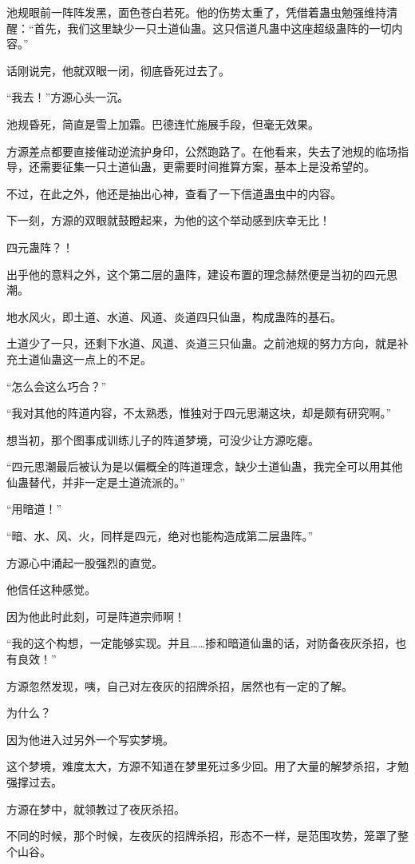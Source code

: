 \begin{this_body}
池规眼前一阵阵发黑，面色苍白若死。他的伤势太重了，凭借着蛊虫勉强维持清醒：“首先，我们这里缺少一只土道仙蛊。这只信道凡蛊中这座超级蛊阵的一切内容。”

话刚说完，他就双眼一闭，彻底昏死过去了。

“我去！”方源心头一沉。

池规昏死，简直是雪上加霜。巴德连忙施展手段，但毫无效果。

方源差点都要直接催动逆流护身印，公然跑路了。在他看来，失去了池规的临场指导，还需要征集一只土道仙蛊，更需要时间推算方案，基本上是没希望的。

不过，在此之外，他还是抽出心神，查看了一下信道蛊虫中的内容。

下一刻，方源的双眼就鼓瞪起来，为他的这个举动感到庆幸无比！

四元蛊阵？！

出乎他的意料之外，这个第二层的蛊阵，建设布置的理念赫然便是当初的四元思潮。

地水风火，即土道、水道、风道、炎道四只仙蛊，构成蛊阵的基石。

土道少了一只，还剩下水道、风道、炎道三只仙蛊。之前池规的努力方向，就是补充土道仙蛊这一点上的不足。

“怎么会这么巧合？”

“我对其他的阵道内容，不太熟悉，惟独对于四元思潮这块，却是颇有研究啊。”

想当初，那个图事成训练儿子的阵道梦境，可没少让方源吃瘪。

“四元思潮最后被认为是以偏概全的阵道理念，缺少土道仙蛊，我完全可以用其他仙蛊替代，并非一定是土道流派的。”

“用暗道！”

“暗、水、风、火，同样是四元，绝对也能构造成第二层蛊阵。”

方源心中涌起一股强烈的直觉。

他信任这种感觉。

因为他此时此刻，可是阵道宗师啊！

“我的这个构想，一定能够实现。并且……掺和暗道仙蛊的话，对防备夜灰杀招，也有良效！”

方源忽然发现，咦，自己对左夜灰的招牌杀招，居然也有一定的了解。

为什么？

因为他进入过另外一个写实梦境。

这个梦境，难度太大，方源不知道在梦里死过多少回。用了大量的解梦杀招，才勉强撑过去。

方源在梦中，就领教过了夜灰杀招。

不同的时候，那个时候，左夜灰的招牌杀招，形态不一样，是范围攻势，笼罩了整个山谷。


\end{this_body}
